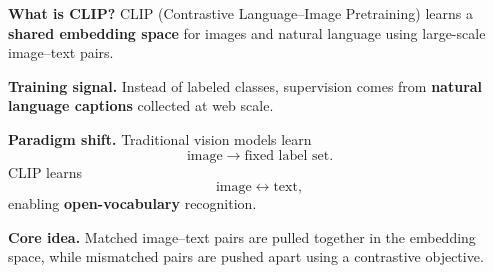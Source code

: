 \textbf{What is CLIP?}
CLIP (Contrastive Language--Image Pretraining) learns a \textbf{shared embedding space}
for images and natural language using large-scale image--text pairs.

\textbf{Training signal.}
Instead of labeled classes, supervision comes from \textbf{natural language captions}
collected at web scale.

\textbf{Paradigm shift.}
Traditional vision models learn
\[
\text{image} \rightarrow \text{fixed label set}.
\]
CLIP learns
\[
\text{image} \leftrightarrow \text{text},
\]
enabling \textbf{open-vocabulary} recognition.

\textbf{Core idea.}
Matched image--text pairs are pulled together in the embedding space,
while mismatched pairs are pushed apart using a contrastive objective.

